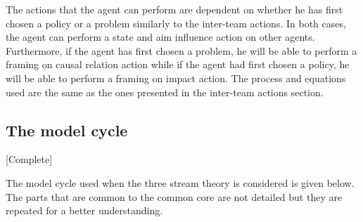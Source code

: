 The actions that the agent can perform are dependent on whether he has first chosen a policy or a problem similarly to the inter-team actions. In both cases, the agent can perform a state and aim influence action on other agents. Furthermore, if the agent has first chosen a problem, he will be able to perform a framing on causal relation action while if the agent had first chosen a policy, he will be able to perform a framing on impact action. The process and equations used are the same as the ones presented in the inter-team actions section.




\subsection{The model cycle} [Complete]


The model cycle used when the three stream theory is considered is given below. The parts that are common to the common core are not detailed but they are repeated for a better understanding.


